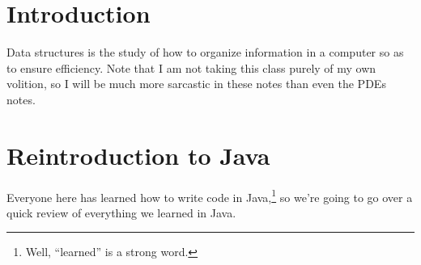 \documentclass[10pt]{mypackage}
\begin{document}
\RaggedRight
\tableofcontents
\section{Introduction}%
Data structures is the study of how to organize information in a computer so as to ensure efficiency. Note that I am not taking this class purely of my own volition, so I will be much more sarcastic in these notes than even the PDEs notes.
\section{Reintroduction to Java}%
Everyone here has learned how to write code in Java,\footnote{Well, ``learned'' is a strong word.} so we're going to go over a quick review of everything we learned in Java.\newline
\end{document}
